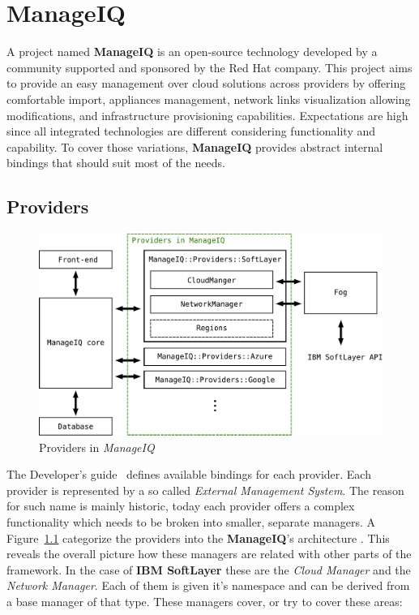 \chapter{ManageIQ}
\label{chap:ManageIQ}

A project named \textbf{ManageIQ} is an open-source technology developed by a community supported and sponsored by the Red Hat company. This project aims to provide an easy management over cloud solutions across providers by offering comfortable import, appliances management, network links visualization allowing modifications, and infrastructure provisioning capabilities. Expectations are high since all integrated technologies are different considering functionality and capability. To cover those variations, \textbf{ManageIQ} provides abstract internal bindings that should suit most of the needs.

\section{Providers}
\label{sec:Providers}

\begin{figure}[ht!]
	\includegraphics[width=\textwidth]{fig/architecture}
	\caption{Providers in \emph{ManageIQ}}\label{fig:Providers in ManageIQ}
\end{figure}

The Developer's guide~\cite{manageiq_dev} defines available bindings for each provider. Each provider is represented by a so called \emph{External Management System}. The reason for such name is mainly historic, today each provider offers a complex functionality which needs to be broken into smaller, separate managers. A Figure~\ref{fig:Providers in ManageIQ}  categorize the providers into the \textbf{ManageIQ}'s architecture . This reveals the overall picture how these managers are related with other parts of the framework. In the case of \textbf{IBM SoftLayer} these are the \emph{Cloud Manager} and the \emph{Network Manager}. Each of them is given it's namespace and can be derived from a base manager of that type. These managers cover, or try to cover these areas:

